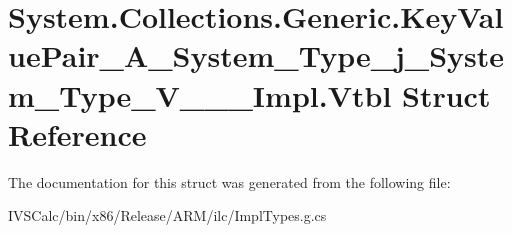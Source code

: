 \hypertarget{struct_system_1_1_collections_1_1_generic_1_1_key_value_pair___a___system___type__j___system___type___v_______impl_1_1_vtbl}{}\section{System.\+Collections.\+Generic.\+Key\+Value\+Pair\+\_\+\+A\+\_\+\+System\+\_\+\+Type\+\_\+j\+\_\+\+System\+\_\+\+Type\+\_\+\+V\+\_\+\+\_\+\+\_\+\+Impl.\+Vtbl Struct Reference}
\label{struct_system_1_1_collections_1_1_generic_1_1_key_value_pair___a___system___type__j___system___type___v_______impl_1_1_vtbl}


The documentation for this struct was generated from the following file\+:\begin{DoxyCompactItemize}
\item 
I\+V\+S\+Calc/bin/x86/\+Release/\+A\+R\+M/ilc/Impl\+Types.\+g.\+cs\end{DoxyCompactItemize}
